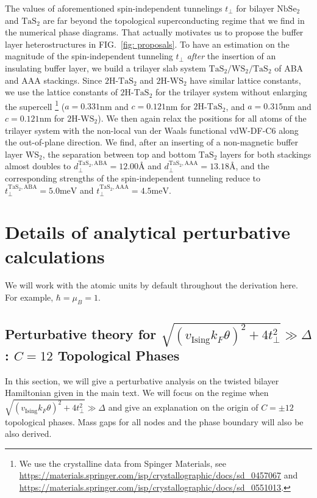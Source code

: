 \begin{subappendices}
    The values of aforementioned spin-independent tunnelings $t_\perp$ for bilayer $\mathrm{NbSe_2}$ and $\mathrm{TaS_2}$ are far beyond the topological superconducting regime that we find in the numerical phase diagrams. That actually motivates us to propose the buffer layer heterostructures in FIG.~\ref{fig: proposals}. To have an estimation on the magnitude of the spin-independent tunneling $t_\perp$ \emph{after} the insertion of an insulating buffer layer, we build a trilayer slab system $\mathrm{TaS_2}/\mathrm{WS_2}/\mathrm{TaS_2}$ of ABA and AAA stackings. Since $\mathrm{2H}$-$\mathrm{TaS_2}$ and $\mathrm{2H}$-$\mathrm{WS_2}$ have similar lattice constants, we use the lattice constants of $\mathrm{2H}$-$\mathrm{TaS_2}$ for the trilayer system without enlarging the supercell \footnote{We use the crystalline data from Spinger Materials, see \protect\url{https://materials.springer.com/isp/crystallographic/docs/sd_0457067} and \protect\url{https://materials.springer.com/isp/crystallographic/docs/sd_0551013}.} ($a=0.331$nm and $c=0.121$nm for $\mathrm{2H}$-$\mathrm{TaS_2}$, and $a=0.315$nm and $c=0.121$nm for $\mathrm{2H}$-$\mathrm{WS_2}$). We then again relax the positions for all atoms of the trilayer system with the non-local van der Waals functional vdW-DF-C6 \cite{tkatchenko2009accurate,berland2019van} along the out-of-plane direction. We find, after an inserting of a non-magnetic buffer layer $\mathrm{WS_2}$, the separation between top and bottom $\mathrm{TaS_2}$ layers for both stackings almost doubles to $d_\perp^{\mathrm{TaS_2},\text{ABA}}=12.00\text{\AA}$ and  $d_\perp^{\mathrm{TaS_2},\text{AAA}}=13.18\text{\AA}$, and the corresponding strengths of the spin-independent tunneling reduce to $t_\perp^{\mathrm{TaS_2},\text{ABA}}=5.0\mathrm{meV}$ and $t_\perp^{\mathrm{TaS_2},\text{AAA}}=4.5\mathrm{meV}$. 
    

\section{Details of analytical perturbative calculations}\label{app:analytical}
	We will work with the atomic units by default throughout the derivation here. For example, $\hbar=\mu_B=1$.
	\hfill\\
	\subsection{Perturbative theory for $\sqrt{(v_{\text{Ising}}k_F\theta)^2+4t_\perp^2}\gg \Delta $: $C=12$ Topological Phases}
		In this section, we will give a perturbative analysis on the twisted bilayer Hamiltonian given in the main text. We will focus on the regime when $\sqrt{(v_{\text{Ising}}k_F\theta)^2+4t_\perp^2}\gg \Delta $ and give an explanation on the origin of $C=\pm12$ topological phases. Mass gaps for all nodes and the phase boundary will also be also derived.

\end{subappendices}
